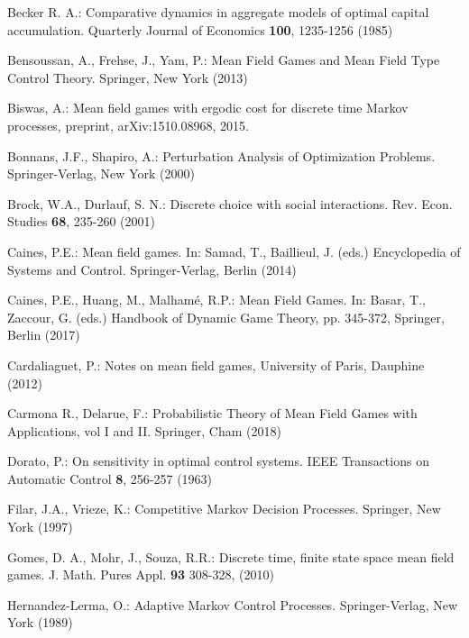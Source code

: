 \begin{thebibliography}{99.}
Becker R. A.:
Comparative dynamics in aggregate models of optimal capital accumulation. Quarterly Journal of Economics \textbf{100}, 1235-1256 (1985)




Bensoussan, A., Frehse, J., Yam, P.: Mean Field Games and Mean
Field Type Control Theory.  Springer, New York (2013)





 Biswas, A.: Mean field games with ergodic cost for discrete time Markov processes,
preprint, arXiv:1510.08968, 2015.




Bonnans, J.F., Shapiro, A.: Perturbation Analysis of Optimization Problems. Springer-Verlag, New York (2000)


 Brock, W.A., Durlauf, S. N.: Discrete choice with social interactions. Rev. Econ. Studies \textbf{68}, 235-260 (2001)





Caines, P.E.: Mean field games. In: Samad, T., Baillieul, J.  (eds.) Encyclopedia of Systems and Control. Springer-Verlag, Berlin (2014)

 Caines, P.E.,  Huang, M., Malham\'e, R.P.: Mean Field Games. In:  Basar, T.,  Zaccour, G. (eds.)
    Handbook of Dynamic
Game Theory, pp. 345-372,  Springer, Berlin  (2017)

Cardaliaguet, P.: Notes on mean field games, University of Paris, Dauphine (2012)

Carmona R.,  Delarue, F.: Probabilistic Theory of Mean Field Games with Applications,
vol I and II.  Springer, Cham (2018)


Dorato, P.: On sensitivity in optimal control systems. IEEE Transactions on Automatic Control \textbf{8}, 256-257 (1963)



Filar, J.A., Vrieze, K.: Competitive Markov
Decision Processes. Springer, New York (1997)


Gomes, D. A.,  Mohr, J., Souza, R.R.: Discrete time, finite state space mean field games. J. Math. Pures Appl. \textbf{93} 308-328, (2010)



Hernandez-Lerma, O.: Adaptive Markov Control Processes. Springer-Verlag, New York (1989)


\end{thebibliography}
